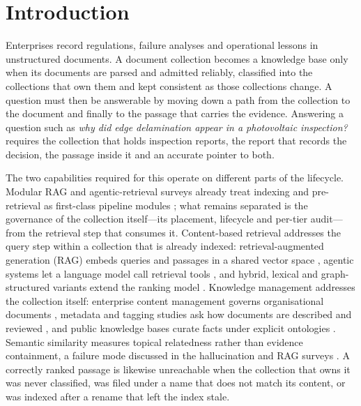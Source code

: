 \section{Introduction}
\label{sec:intro}

Enterprises record regulations, failure analyses and operational lessons in
unstructured documents. A document collection becomes a knowledge base only
when its documents are parsed and admitted reliably, classified into the
collections that own them and kept consistent as those collections change.
A question must then be answerable by moving down a path from the collection
to the document and finally to the passage that carries the evidence.
Answering a question such as \emph{why did edge delamination appear in a
photovoltaic inspection?} requires the collection that holds inspection
reports, the report that records the decision, the passage inside it and an
accurate pointer to both.

The two capabilities required for this operate on different parts of the
lifecycle. Modular RAG and agentic-retrieval surveys already treat indexing
and pre-retrieval as first-class pipeline modules
\cite{modular-rag,gao-ragsurvey}; what remains separated is the governance of
the collection itself---its placement, lifecycle and per-tier audit---from
the retrieval step that consumes it. Content-based
retrieval addresses the query step within a collection that is already
indexed: retrieval-augmented generation (RAG) embeds queries and passages in
a shared vector space \cite{rag-lewis,dpr}, agentic systems let a language
model call retrieval tools \cite{mcp,singh-agentic-rag}, and hybrid, lexical
and graph-structured variants extend the ranking model
\cite{bm25,rrf-cormack,graphrag,lightrag,raptor}. Knowledge management
addresses the collection itself: enterprise content management governs
organisational documents \cite{paivarinta-ecm-2005,tyrvaainen-ecm-2006},
metadata and tagging studies ask how documents are described and reviewed
\cite{park-metadata-quality-2009,golder-tagging-2006}, and public knowledge
bases curate facts under explicit ontologies
\cite{auer-dbpedia-kb-2007,hoffart-yago2-kb-2013}. Semantic similarity
measures topical relatedness rather than evidence containment, a failure mode
discussed in the hallucination and RAG surveys \cite{siren,gao-ragsurvey}.
A correctly ranked passage is
likewise unreachable when the collection that owns it was never classified, was filed
under a name that does not match its content, or was indexed after a rename
that left the index stale.

